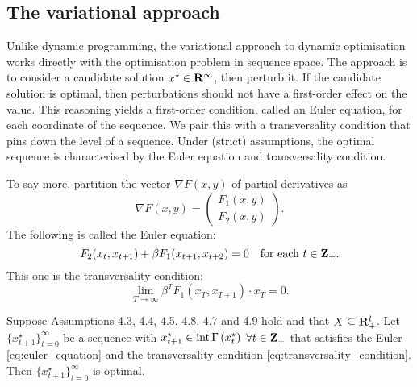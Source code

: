 \documentclass[11pt,letterpaper,reqno,oneside]{article}
\begin{document}
\subsection{The variational approach}
\label{sec:21Sep2015:variational_approach}

Unlike dynamic programming, the variational approach to dynamic optimisation works directly with the optimisation problem in sequence space. The approach is to consider a candidate solution $x^\star \in \mathbf{R}^\infty$, then perturb it. If the candidate solution is optimal, then perturbations should not have a first-order effect on the value. This reasoning yields a first-order condition, called an Euler equation, for each coordinate of the sequence. We pair this with a transversality condition that pins down the level of a sequence. Under (strict) assumptions, the optimal sequence is characterised by the Euler equation and transversality condition.

To say more, partition the vector $\nabla F(x,y)$ of partial derivatives as
%
\begin{equation*}
	\nabla F(x,y) =
	\begin{pmatrix}
		F_1(x,y) \\
		F_2(x,y)
	\end{pmatrix} .
\end{equation*}
%
The following is called the Euler equation:
%
\begin{equation}
	F_2(x_t,x_{t+1}) + \beta F_1(x_{t+1},x_{t+2}) = 0
	\quad\text{for each $t \in \mathbf{Z}_+$} .
	\label{eq:euler_equation}
\end{equation}
%
This one is the transversality condition:
%
\begin{equation}
	\lim_{T \to \infty} \beta^T F_1(x_T,x_{T+1}) \cdot x_T = 0 .
	\label{eq:transversality_condition}
\end{equation}


\begin{theorem}[SLP Th'm 4.15]
	Suppose Assumptions 4.3, 4.4, 4.5, 4.8, 4.7 and 4.9 hold and that $X \subseteq \mathbf{R}_+^l$. Let $\{ x^\star_{t+1} \}_{t=0}^\infty$ be a sequence with $x^\star_{t+1} \in \operatorname*{int}{ \Gamma \left( x^\star_t \right) }$ $\forall t \in \mathbf{Z}_+$ that satisfies the Euler \cref{eq:euler_equation} and the transversality condition \eqref{eq:transversality_condition}. Then $\{ x^\star_{t+1} \}_{t=0}^\infty$ is optimal.
\end{theorem}
\end{document}
